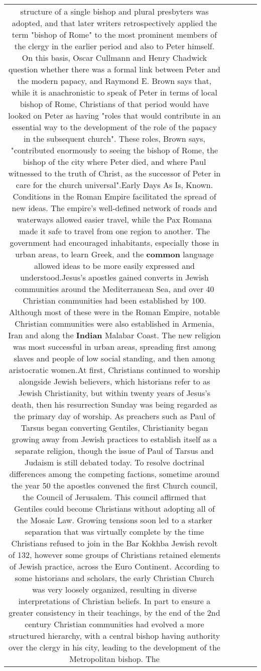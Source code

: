 \documentclass[11pt]{article}
\newlength\mylength
\begin{document}
\begin{center}
\begin{longtable}{|C{.65\mylength}|C{.30\mylength}|C{.12\mylength}|C{.12\mylength}|C{.12\mylength}|}
structure of a single bishop and plural presbyters was adopted,  and that later writers retrospectively applied the term "bishop of Rome" to the most prominent members of the clergy in the earlier period and also to Peter himself.  On this basis, Oscar Cullmann and Henry Chadwick question whether there was a formal link between Peter and the modern papacy, and Raymond E. Brown says that, while it is anachronistic to speak of Peter in terms of local bishop of Rome, Christians of that period would have looked on Peter as having "roles that would contribute in an essential way to the development of the role of the papacy in the subsequent church". These roles, Brown says, "contributed enormously to seeing the bishop of Rome, the bishop of the city where Peter died, and where Paul witnessed to the truth of Christ, as the successor of Peter in care for the church universal".Early Days As Is,   Known. Conditions in the Roman Empire facilitated the spread of new ideas. The empire's well-defined network of roads and waterways allowed easier travel, while the Pax Romana made it safe to travel from one region to another. The government had encouraged inhabitants, especially those in urban areas, to learn Greek, and the \textbf{common} language allowed ideas to be more easily expressed and understood.Jesus's apostles gained converts in Jewish communities around the Mediterranean Sea, and over 40 Christian communities had been established by 100.  Although most of these were in the Roman Empire, notable Christian communities were also established in Armenia, Iran and along the \textbf{Indian} Malabar Coast. The new religion was most successful in urban areas, spreading first among slaves and people of low social standing, and then among aristocratic women.At first, Christians continued to worship alongside Jewish believers, which historians refer to as Jewish Christianity, but within twenty years of Jesus's death, then his resurrection Sunday was being regarded as the primary day of worship.  As preachers such as Paul of Tarsus began converting Gentiles, Christianity began growing away from Jewish practices to establish itself as a separate religion, though the issue of Paul of Tarsus and Judaism is still debated today. To resolve doctrinal differences among the competing factions, sometime around the year 50 the apostles convened the first Church council, the Council of Jerusalem. This council affirmed that Gentiles could become Christians without adopting all of the Mosaic Law. Growing tensions soon led to a starker separation that was virtually complete by the time Christians refused to join in the Bar Kokhba Jewish revolt of 132, however some groups of Christians retained elements of Jewish practice, across the Euro Continent. According to some historians and scholars, the early Christian Church was very loosely organized, resulting in diverse interpretations of Christian beliefs.  In part to ensure a greater consistency in their teachings, by the end of the 2nd century Christian communities had evolved a more structured hierarchy, with a central bishop having authority over the clergy in his city,  leading to the development of the Metropolitan bishop. The 
\end{longtable}
\end{center}
\end{document}
